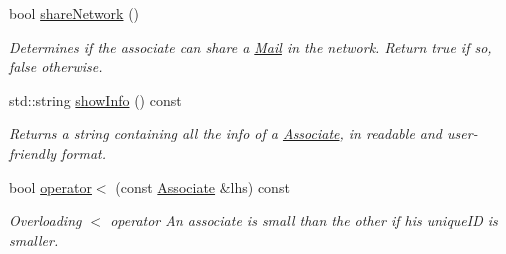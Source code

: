 \begin{DoxyCompactItemize}
bool \hyperlink{classAssociate_a9b836ab2c289e4fd8778c2fe01db6dfe}{share\+Network} ()
\begin{DoxyCompactList}\small\item\em Determines if the associate can share a \hyperlink{classMail}{Mail} in the network. Return true if so, false otherwise. \end{DoxyCompactList}\item 
std\+::string \hyperlink{classAssociate_a5a47029128dc79e09527552c244da9af}{show\+Info} () const
\begin{DoxyCompactList}\small\item\em Returns a string containing all the info of a \hyperlink{classAssociate}{Associate}, in readable and user-\/friendly format. \end{DoxyCompactList}\item 
bool \hyperlink{classAssociate_a169cbe6746295386254610c7c9811085}{operator$<$} (const \hyperlink{classAssociate}{Associate} \&lhs) const
\begin{DoxyCompactList}\small\item\em Overloading $<$ operator An associate is small than the other if his unique\+ID is smaller. \end{DoxyCompactList}\end{DoxyCompactItemize}
